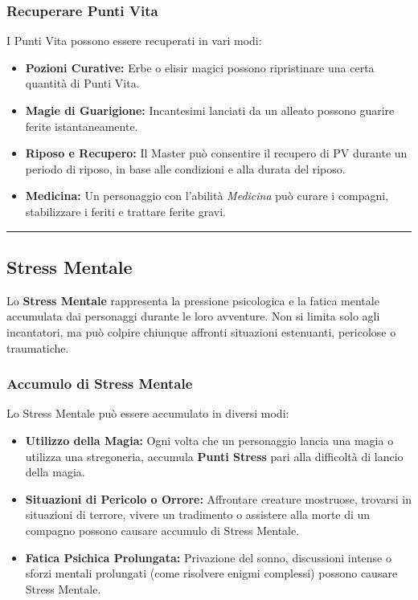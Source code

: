 \documentclass[../manuale_main.tex]{subfiles}
\begin{document}
\vspace{0.3cm}

\subsubsection{Recuperare Punti Vita}
I Punti Vita possono essere recuperati in vari modi:
\begin{itemize}
    \item \textbf{Pozioni Curative:} Erbe o elisir magici possono ripristinare una certa quantità di Punti Vita.
    \item \textbf{Magie di Guarigione:} Incantesimi lanciati da un alleato possono guarire ferite istantaneamente.
    \item \textbf{Riposo e Recupero:} Il Master può consentire il recupero di PV durante un periodo di riposo, in base alle condizioni e alla durata del riposo.
    \item \textbf{Medicina:} Un personaggio con l'abilità \textit{Medicina} può curare i compagni, stabilizzare i feriti e trattare ferite gravi.
\end{itemize}

\vspace{0.5cm}
\rule{\textwidth}{0.4pt}
\vspace{0.5cm}

\subsection{Stress Mentale}

Lo \textbf{Stress Mentale} rappresenta la pressione psicologica e la fatica mentale accumulata dai personaggi durante le loro avventure. Non si limita solo agli incantatori, ma può colpire chiunque affronti situazioni estenuanti, pericolose o traumatiche.  

\subsubsection{Accumulo di Stress Mentale}
Lo Stress Mentale può essere accumulato in diversi modi:
\begin{itemize}
    \item \textbf{Utilizzo della Magia:} Ogni volta che un personaggio lancia una magia o utilizza una stregoneria, accumula \textbf{Punti Stress} pari alla difficoltà di lancio della magia. 
    
    \item \textbf{Situazioni di Pericolo o Orrore:} Affrontare creature mostruose, trovarsi in situazioni di terrore, vivere un tradimento o assistere alla morte di un compagno possono causare accumulo di Stress Mentale.
    
    \item \textbf{Fatica Psichica Prolungata:} Privazione del sonno, discussioni intense o sforzi mentali prolungati (come risolvere enigmi complessi) possono causare Stress Mentale.
\end{itemize}
\end{document}
